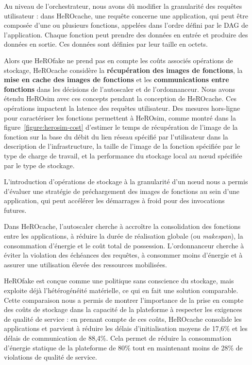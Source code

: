 Au niveau de l'orchestrateur, nous avons dû modifier la granularité des requêtes utilisateur : dans HeROcache, une requête concerne une application, qui peut être composée d'une ou plusieurs fonctions, appelées dans l'ordre défini par le \gls{DAG} de l'application. Chaque fonction peut prendre des données en entrée et produire des données en sortie. Ces données sont définies par leur taille en octets.

Alors que HeROfake ne prend pas en compte les coûts associés opérations de stockage, HeROcache considère la \textbf{récupération des images de fonctions}, la \textbf{mise en cache des images de fonctions} et les \textbf{communications entre fonctions} dans les décisions de l'autoscaler et de l'ordonnanceur. Nous avons étendu HeROsim avec ces concepts pendant la conception de HeROcache. Ces opérations impactent la latence des requêtes utilisateur. Des mesures hors-ligne pour caractériser les fonctions permettent à HeROsim, comme montré dans la figure~\ref{figure:herosim-cost} d'estimer le temps de récupération de l'image de la fonction sur la base du débit du lien réseau spécifié par l'utilisateur dans la description de l'infrastructure, la taille de l'image de la fonction spécifiée par le type de charge de travail, et la performance du stockage local au nœud spécifiée par le type de stockage.

L'introduction d'opérations de stockage à la granularité d'un nœud nous a permis d'évaluer une stratégie de préchargement des images de fonctions au sein d'une application, qui peut accélérer les démarrages à froid pour des invocations futures.

Dans HeROcache, l'autoscaler cherche à accroître la consolidation des fonctions entre les applications, à réduire la durée de réalisation globale (ou \textit{makespan}), la consommation d'énergie et le coût total de possession. L'ordonnanceur cherche à éviter la violation des échéances des requêtes, à consommer moins d'énergie et à assurer une utilisation élevée des ressources mobilisées.

HeROfake est conçue comme une politique sans conscience du stockage, mais exploite déjà l'hétérogénéité matérielle, ce qui en fait une solution comparable. Cette comparaison nous a permis de montrer l'importance de la prise en compte des coûts de stockage dans la capacité de la plateforme à respecter les exigences de qualité de service : en prenant compte de ces coûts, HeROcache consolide les applications et parvient à réduire les délais d'initialisation moyens de 17,6\% et les délais de communication de 88,4\%. Cela permet de réduire la consommation d'énergie statique de la plateforme de 80\% tout en maintenant moins de 28\% de violations de qualité de service.

